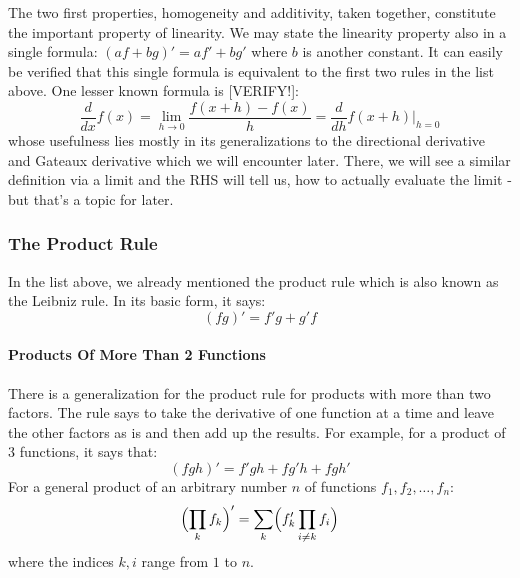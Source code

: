 The two first properties, homogeneity and additivity, taken together, constitute the important property of linearity. We may state the linearity property also in a single formula: $(a f + b g)' = a f' + b g'$ where $b$ is another constant. It can easily be verified that this single formula is equivalent to the first two rules in the list above. One lesser known formula is [VERIFY!]:
\begin{equation}
\label{Eq:DerivativeViaH}
 \frac{d}{d x} f(x) 
 = \lim_{h \rightarrow 0} \frac{f(x + h) - f(x)}{h}
 = \frac{d}{d h} f(x + h) \bigg\rvert_{h=0}
\end{equation}
whose usefulness lies mostly in its generalizations to the directional derivative and Gateaux derivative which we will encounter later. There, we will see a similar definition via a limit and the RHS will tell us, how to actually evaluate the limit - but that's a topic for later. 




\subsubsection{The Product Rule}
In the list above, we already mentioned the product rule which is also known as the Leibniz rule. In its basic form, it says:
\begin{equation}
 (f g)'  = f' g + g' f
\end{equation}

\paragraph{Products Of More Than 2 Functions}

There is a generalization for the product rule for products with more than two factors. The rule says to take the derivative of one function at a time and leave the other factors as is and then add up the results. For example, for a product of 3 functions, it says that:
\begin{equation}
(fgh)' =  f' g h + f g' h + f g h'
\end{equation}
For a general product of an arbitrary number $n$ of functions $f_1, f_2, \ldots, f_n$:
\begin{equation}
\Bigl(  \prod_k f_k   \Bigr) '
= \sum_k \Bigl( f_k' \prod_{i \neq k} f_i  \Bigr) 
\end{equation}
where the indices $k,i$ range from $1$ to $n$.

